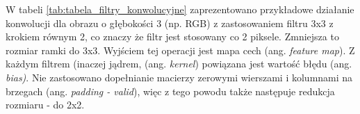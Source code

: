 W tabeli \ref{tab:tabela_filtry_konwolucyjne} zaprezentowano przykładowe działanie konwolucji dla obrazu o głębokości 3 (np. RGB) z zastosowaniem filtru 3x3 z krokiem równym 2, co znaczy że filtr jest stosowany co 2 piksele. Zmniejsza to rozmiar ramki do 3x3. Wyjściem tej operacji jest mapa cech (ang. \textit{feature map}). Z każdym filtrem (inaczej jądrem, (ang. \textit{kernel}) powiązana jest wartość błędu (ang. \textit{bias)}. Nie zastosowano dopełnianie macierzy zerowymi wierszami i kolumnami na brzegach (ang. \textit{padding - valid}), więc z tego powodu także następuje redukcja rozmiaru - do 2x2. 

\begin{table}[h]
\centering
\caption[Short Heading]{Przykładowe działanie konwolucji.}
\end{table}
